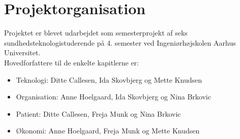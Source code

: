 \section{Projektorganisation}
Projektet er blevet udarbejdet som semesterprojekt af seks sundhedsteknologistuderende på 4. semester ved Ingeniørhøjskolen Aarhus Universitet. \\
Hovedforfattere til de enkelte kapitlerne er:
\begin{itemize}
\item Teknologi: Ditte Callesen, Ida Skovbjerg og  Mette Knudsen
\item Organisation: Anne Hoelgaard, Ida Skovbjerg og Nina Brkovic
\item Patient: Ditte Callesen, Freja Munk og Nina Brkovic
\item Økonomi: Anne Hoelgaard, Freja Munk og Mette Knudsen
\end{itemize}

\label{version_Systemark}
